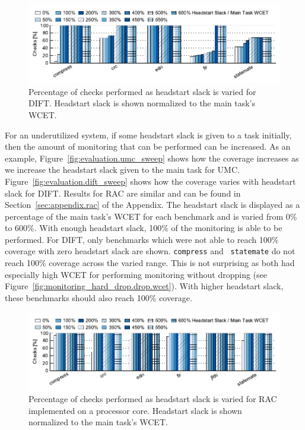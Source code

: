 \begin{figure}
  \begin{center}
    \includegraphics{monitoring_hard_drop/data/dift_sweep.pdf}
    \caption{Percentage of checks performed as headstart slack is varied for
    DIFT. Headstart slack is shown normalized to the main task's WCET.}
    \label{fig:monitoring_hard_drop.evaluation.dift_sweep}
  \end{center}
\end{figure}

For an underutilized system, if some headstart slack is given to a task
initially, then the amount of monitoring that can be performed can be
increased. As an example, Figure~\ref{fig:evaluation.umc_sweep} shows how the
coverage increases as we increase the headstart slack given to the main task
for UMC. Figure~\ref{fig:evaluation.dift_sweep} shows how the coverage varies
with headstart slack for DIFT. Results for RAC are similar and can be found in
Section~\ref{sec:appendix.rac} of the Appendix.  The headstart slack is
displayed as a percentage of the main task's WCET for each benchmark and is
varied from 0\% to 600\%. With enough headstart slack, 100\% of the monitoring
is able to be performed. For DIFT, only benchmarks which were not able to reach
100\% coverage with zero headstart slack are shown.  {\tt compress} and {\tt
statemate} do not reach 100\% coverage across the varied range. This is not
surprising as both had especially high WCET for performing monitoring without
dropping (see Figure~\ref{fig:monitoring_hard_drop.drop.wcet}). With higher
headstart slack, these benchmarks should also reach 100\% coverage.

\begin{figure}
  \begin{center}
    \includegraphics{monitoring_hard_drop/data/lrc_sweep.pdf}
    \caption{Percentage of checks performed as headstart slack is varied for
    RAC implemented on a processor core. Headstart slack is shown normalized
    to the main task's WCET.}
    \label{fig:monitoring_hard_drop.evaluation.lrc_sweep}
  \end{center}
\end{figure}

